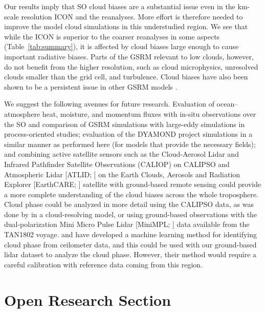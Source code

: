 \documentclass[draft]{agujournal2019}
\begin{document}
Our results imply that SO cloud biases are a substantial issue even in the km-scale resolution ICON and the reanalyses. More effort is therefore needed to improve the model cloud simulations in this understudied region. We see that while the ICON is superior to the coarser reanalyses in some aspects (Table~\ref{tab:summary}), it is affected by cloud biases large enough to cause important radiative biases. Parts of the GSRM relevant to low clouds, however, do not benefit from the higher resolution, such as cloud microphysics, unresolved clouds smaller than the grid cell, and turbulence. Cloud biases have also been shown to be a persistent issue in other GSRM models \cite{seiki2022}.

We suggest the following avenues for future research. Evaluation of ocean–atmosphere heat, moisture, and momentum fluxes with in-situ observations over the SO and comparison of GSRM simulations with large-eddy simulations in process-oriented studies; evaluation of the DYAMOND project simulations in a similar manner as performed here (for models that provide the necessary fields); and combining active satellite sensors such as the Cloud-Aerosol Lidar and Infrared Pathfinder Satellite Observations (CALIOP) on CALIPSO and Atmospheric Lidar [ATLID; ] on the Earth Clouds, Aerosols and Radiation Explorer [EarthCARE; ] satellite with ground-based remote sensing could provide a more complete understanding of the cloud biases across the whole troposphere. Cloud phase could be analyzed in more detail using the CALIPSO data, as was done by  in a cloud-resolving model, or using ground-based observations with the dual-polarization Mini Micro Pulse Lidar [MiniMPL; ] data available from the TAN1802 voyage.  and  have developed a machine learning method for identifying cloud phase from ceilometer data, and this could be used with our ground-based lidar dataset to analyze the cloud phase. However, their method would require a careful calibration with reference data coming from this region.

\section*{Open Research Section}
\end{document}
